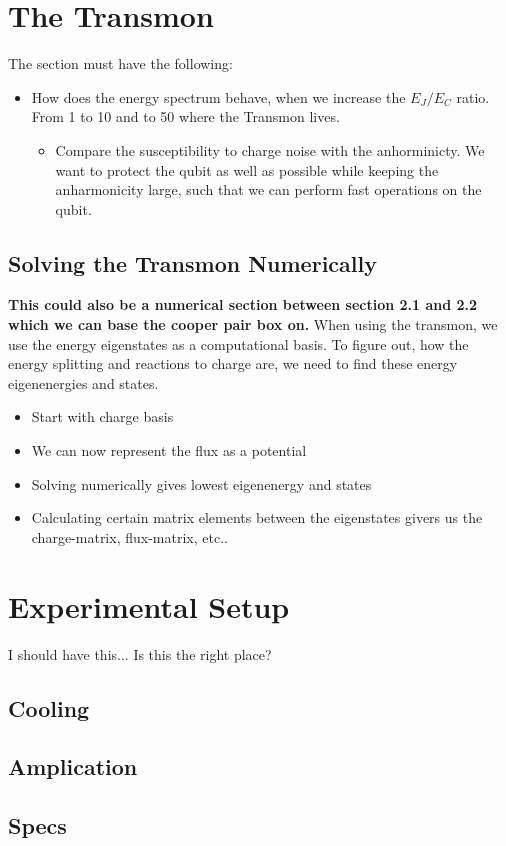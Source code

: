 \section{The Transmon}
The section must have the following:
\begin{itemize}
    \item How does the energy spectrum behave, when we increase the $E_J / E_C$ ratio. From 1 to 10 and to 50 where the Transmon lives.
    \begin{itemize}
        \item Compare the susceptibility to charge noise with the anhorminicty. We want to protect the qubit as well as possible while keeping the anharmonicity large, such that we can perform fast operations on the qubit. 
    \end{itemize}
\end{itemize}

\subsection{Solving the Transmon Numerically}
\textbf{This could also be a numerical section between section 2.1 and 2.2 which we can base the cooper pair box on. }
When using the transmon, we use the energy eigenstates as a computational basis. To figure out, how the energy splitting and reactions to charge are, we need to find these energy eigenenergies and states.

\begin{itemize}
    \item Start with charge basis
    \item We can now represent the flux as a potential
    \item Solving numerically gives lowest eigenenergy and states
    \item Calculating certain matrix elements between the eigenstates givers us the charge-matrix, flux-matrix, etc.. 
\end{itemize}


\section{Experimental Setup}
I should have this... Is this the right place? 

\subsection{Cooling}

\subsection{Amplication}

\subsection{Specs}








